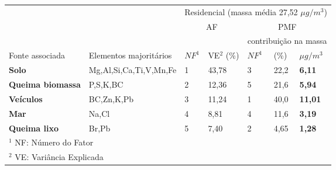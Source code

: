 \begin{tabular}{llll|lll}
\hline
                                                  &                        & \multicolumn{5}{c}{Residencial (massa média 27,52 $\mu g / m^3$)}     \\
                                                  &                        & \multicolumn{2}{c}{AF}      & \multicolumn{3}{c}{PMF}                   \\
\hline
 & & & & \multicolumn{3}{c}{contribuição na massa}  \\
Fonte associada                                   & Elementos majoritários & $NF^1$   & VE$^2$ (\%)               & $NF^1$   & (\%)   & $\mu g / m^3$  \\
\hline
\textbf{Solo}                                     & Mg,Al,Si,Ca,Ti,V,Mn,Fe & 1   & 43,78                 & 3   & 22,2         & \textbf{6,11}   \\
\textbf{Queima biomassa}                          & P,S,K,BC                  & 2   & 12,36                 & 5   & 21,6         & \textbf{5,94}  \\
\textbf{Veículos}                                 & BC,Zn,K,Pb             & 3   & 11,24                 & 1   & 40,0           & \textbf{11,01}   \\
\textbf{Mar}                                      & Na,Cl                  & 4   & 8,81                  & 4   & 11,6         & \textbf{3,19}    \\
\textbf{Queima lixo} & Br,Pb                      & 5   & 7,40                   & 2   & 4,65         & \textbf{1,28}   \\

\hline
\multicolumn{7}{l}{$^1$ NF: Número do Fator} \\
\multicolumn{7}{l}{$^2$ VE: Variância Explicada} \\
\hline
\end{tabular}

